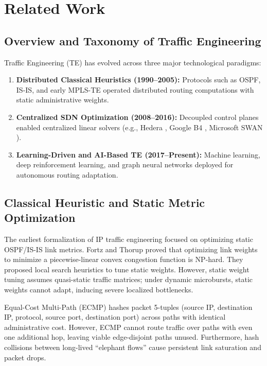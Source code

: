 \documentclass[12pt,a4paper,oneside]{report}
\begin{document}
\chapter{Related Work}
\label{chap:related}

\section{Overview and Taxonomy of Traffic Engineering}
Traffic Engineering (TE) has evolved across three major technological paradigms:
\begin{enumerate}
    \item \textbf{Distributed Classical Heuristics (1990--2005):} Protocols such as OSPF, IS-IS, and early MPLS-TE operated distributed routing computations with static administrative weights.
    \item \textbf{Centralized SDN Optimization (2008--2016):} Decoupled control planes enabled centralized linear solvers (e.g., Hedera \cite{al2010hedera}, Google B4 \cite{jain2013b4}, Microsoft SWAN \cite{hong2013achieving}).
    \item \textbf{Learning-Driven and AI-Based TE (2017--Present):} Machine learning, deep reinforcement learning, and graph neural networks deployed for autonomous routing adaptation.
\end{enumerate}

\section{Classical Heuristic and Static Metric Optimization}
The earliest formalization of IP traffic engineering focused on optimizing static OSPF/IS-IS link metrics. Fortz and Thorup \cite{fortz2000internet, fortz2002optimizing} proved that optimizing link weights to minimize a piecewise-linear convex congestion function is NP-hard. They proposed local search heuristics to tune static weights. However, static weight tuning assumes quasi-static traffic matrices; under dynamic microbursts, static weights cannot adapt, inducing severe localized bottlenecks.

Equal-Cost Multi-Path (ECMP) \cite{moy1998ospf} hashes packet 5-tuples (source IP, destination IP, protocol, source port, destination port) across paths with identical administrative cost. However, ECMP cannot route traffic over paths with even one additional hop, leaving viable edge-disjoint paths unused. Furthermore, hash collisions between long-lived ``elephant flows'' cause persistent link saturation and packet drops.
\end{document}
